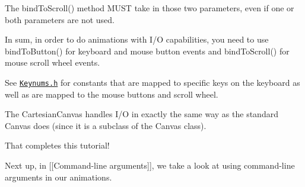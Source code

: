 The {\ttfamily bind\-To\-Scroll()} method M\-U\-S\-T take in those two parameters, even if one or both parameters are not used.

In sum, in order to do animations with I/\-O capabilities, you need to use {\ttfamily bind\-To\-Button()} for keyboard and mouse button events and {\ttfamily bind\-To\-Scroll()} for mouse scroll wheel events.

See \href{http://calvin-cs.github.io/TSGL/html/_keynums_8h_source.html}{\tt Keynums.\-h} for constants that are mapped to specific keys on the keyboard as well as are mapped to the mouse buttons and scroll wheel.

The Cartesian\-Canvas handles I/\-O in exactly the same way as the standard Canvas does (since it is a subclass of the Canvas class).

That completes this tutorial!

Next up, in \mbox{[}\mbox{[}Command-\/line arguments\mbox{]}\mbox{]}, we take a look at using command-\/line arguments in our animations. 
